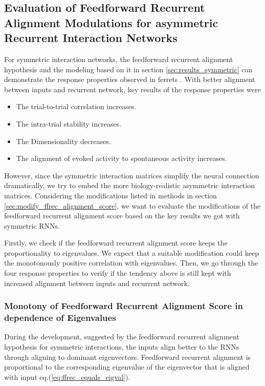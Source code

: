 \documentclass[11pt]{article}
\begin{document}
	\subsection{Evaluation of Feedforward Recurrent Alignment Modulations for asymmetric Recurrent Interaction Networks} \label{sec:asymmetric_results}
	For symmetric interaction networks, the feedforward recurrent alignment hypothesis and the modeling based on it in section \ref{sec:results_symmetric} can demonstrate the response properties observed in ferrets \cite{tragenap2023nature}. With better alignment between inputs and recurrent network, key results of the response properties were
		\begin{itemize}
			\item The trial-to-trial correlation increases.
			\item The intra-trial stability increases.
			\item The Dimensionality decreases.
			\item The alignment of evoked activity to spontaneous activity increases.
		\end{itemize}
	
	However, since the symmetric interaction matrices simplify the neural connection dramatically, we try to embed the more biology-realistic asymmetric interaction matrices. Considering the modifications listed in methods in section \ref{sec:modify_ffrec_alignment_score}, we want to evaluate the modifications of the feedforward recurrent alignment score based on the key results we got with symmetric RNNs. 
	
	Firstly, we check if the feedforward recurrent alignment score keeps the proportionality to eigenvalues. We expect that a suitable modification could keep the monotonously positive correlation with eigenvalues. Then, we go through the four response properties to verify if the tendency above is still kept with increased alignment between inputs and recurrent network. 
	\vspace{0.5cm}
	\subsubsection{Monotony of Feedforward Recurrent Alignment Score in dependence of Eigenvalues}
	
	During the development, suggested by the feedforward recurrent alignment hypothesis for symmetric interactions, the inputs align better to the RNNs through aligning to dominant eigenvectors. Feedforward recurrent alignment is proportional to the corresponding eigenvalue of the eigenvector that is aligned with input eq.(\ref{eq:ffrec_equals_eigval}). 
	
\end{document}

